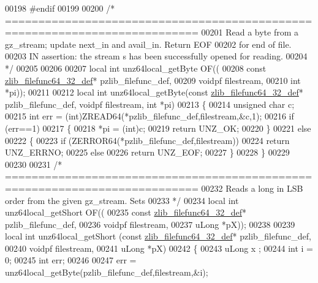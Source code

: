 \begin{DoxyCode}
00198 \textcolor{preprocessor}{#endif}
00199 
00200 \textcolor{comment}{/* ===========================================================================}
00201 \textcolor{comment}{     Read a byte from a gz\_stream; update next\_in and avail\_in. Return EOF}
00202 \textcolor{comment}{   for end of file.}
00203 \textcolor{comment}{   IN assertion: the stream s has been successfully opened for reading.}
00204 \textcolor{comment}{*/}
00205 
00206 
00207 local \textcolor{keywordtype}{int} unz64local\_getByte OF((
00208     \textcolor{keyword}{const} \hyperlink{structzlib__filefunc64__32__def__s}{zlib\_filefunc64\_32\_def}* pzlib\_filefunc\_def,
00209     voidpf filestream,
00210     \textcolor{keywordtype}{int} *pi));
00211 
00212 local \textcolor{keywordtype}{int} unz64local\_getByte(\textcolor{keyword}{const} \hyperlink{structzlib__filefunc64__32__def__s}{zlib\_filefunc64\_32\_def}* pzlib\_filefunc\_def, voidpf
       filestream, \textcolor{keywordtype}{int} *pi)
00213 \{
00214     \textcolor{keywordtype}{unsigned} \textcolor{keywordtype}{char} c;
00215     \textcolor{keywordtype}{int} err = (int)ZREAD64(*pzlib\_filefunc\_def,filestream,&c,1);
00216     \textcolor{keywordflow}{if} (err==1)
00217     \{
00218         *pi = (int)c;
00219         \textcolor{keywordflow}{return} UNZ\_OK;
00220     \}
00221     \textcolor{keywordflow}{else}
00222     \{
00223         \textcolor{keywordflow}{if} (ZERROR64(*pzlib\_filefunc\_def,filestream))
00224             \textcolor{keywordflow}{return} UNZ\_ERRNO;
00225         \textcolor{keywordflow}{else}
00226             \textcolor{keywordflow}{return} UNZ\_EOF;
00227     \}
00228 \}
00229 
00230 
00231 \textcolor{comment}{/* ===========================================================================}
00232 \textcolor{comment}{   Reads a long in LSB order from the given gz\_stream. Sets}
00233 \textcolor{comment}{*/}
00234 local \textcolor{keywordtype}{int} unz64local\_getShort OF((
00235     \textcolor{keyword}{const} \hyperlink{structzlib__filefunc64__32__def__s}{zlib\_filefunc64\_32\_def}* pzlib\_filefunc\_def,
00236     voidpf filestream,
00237     uLong *pX));
00238 
00239 local \textcolor{keywordtype}{int} unz64local\_getShort (\textcolor{keyword}{const} \hyperlink{structzlib__filefunc64__32__def__s}{zlib\_filefunc64\_32\_def}* pzlib\_filefunc\_def,
00240                              voidpf filestream,
00241                              uLong *pX)
00242 \{
00243     uLong x ;
00244     \textcolor{keywordtype}{int} i = 0;
00245     \textcolor{keywordtype}{int} err;
00246 
00247     err = unz64local\_getByte(pzlib\_filefunc\_def,filestream,&i);

\end{DoxyCode}
